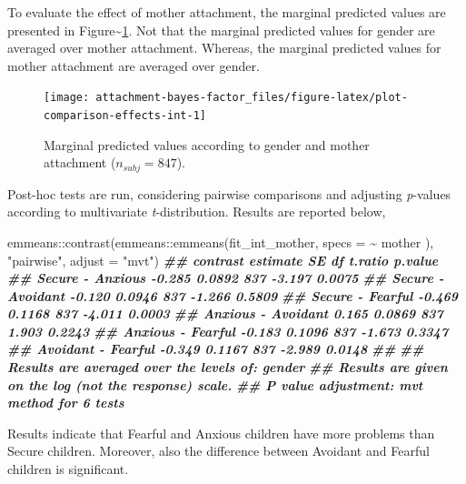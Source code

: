 \documentclass[
]{book}
\newenvironment{Shaded}{\begin{snugshade}}{\end{snugshade}}
\newcommand{\AttributeTok}[1]{\textcolor[rgb]{0.77,0.63,0.00}{#1}}
\newcommand{\DocumentationTok}[1]{\textcolor[rgb]{0.56,0.35,0.01}{\textbf{\textit{#1}}}}
\newcommand{\FunctionTok}[1]{\textcolor[rgb]{0.00,0.00,0.00}{#1}}
\newcommand{\NormalTok}[1]{#1}
\newcommand{\SpecialCharTok}[1]{\textcolor[rgb]{0.00,0.00,0.00}{#1}}
\newcommand{\StringTok}[1]{\textcolor[rgb]{0.31,0.60,0.02}{#1}}
\begin{document}
To evaluate the effect of mother attachment, the marginal predicted values are presented in Figure\textasciitilde\ref{fig:plot-comparison-effects-int}. Not that the marginal predicted values for gender are averaged over mother attachment. Whereas, the marginal predicted values for mother attachment are averaged over gender.

\begin{figure}

{\centering \texttt{[image: attachment-bayes-factor\_files/figure-latex/plot-comparison-effects-int-1]} 

}

\caption{Marginal predicted values according to gender and mother attachment ($n_{subj} = 847$).}\label{fig:plot-comparison-effects-int}
\end{figure}

Post-hoc tests are run, considering pairwise comparisons and adjusting \emph{p}-values according to multivariate \emph{t}-distribution. Results are reported below,

\begin{Shaded}
\begin{Highlighting}[]
\NormalTok{emmeans}\SpecialCharTok{::}\FunctionTok{contrast}\NormalTok{(emmeans}\SpecialCharTok{::}\FunctionTok{emmeans}\NormalTok{(fit\_int\_mother, }\AttributeTok{specs =} \SpecialCharTok{\textasciitilde{}}\NormalTok{ mother ),}
                  \StringTok{"pairwise"}\NormalTok{, }\AttributeTok{adjust =} \StringTok{"mvt"}\NormalTok{)}
\DocumentationTok{\#\#  contrast           estimate     SE  df t.ratio p.value}
\DocumentationTok{\#\#  Secure {-} Anxious     {-}0.285 0.0892 837  {-}3.197  0.0075}
\DocumentationTok{\#\#  Secure {-} Avoidant    {-}0.120 0.0946 837  {-}1.266  0.5809}
\DocumentationTok{\#\#  Secure {-} Fearful     {-}0.469 0.1168 837  {-}4.011  0.0003}
\DocumentationTok{\#\#  Anxious {-} Avoidant    0.165 0.0869 837   1.903  0.2243}
\DocumentationTok{\#\#  Anxious {-} Fearful    {-}0.183 0.1096 837  {-}1.673  0.3347}
\DocumentationTok{\#\#  Avoidant {-} Fearful   {-}0.349 0.1167 837  {-}2.989  0.0148}
\DocumentationTok{\#\# }
\DocumentationTok{\#\# Results are averaged over the levels of: gender }
\DocumentationTok{\#\# Results are given on the log (not the response) scale. }
\DocumentationTok{\#\# P value adjustment: mvt method for 6 tests}
\end{Highlighting}
\end{Shaded}

Results indicate that Fearful and Anxious children have more problems than Secure children. Moreover, also the difference between Avoidant and Fearful children is significant.
\end{document}
